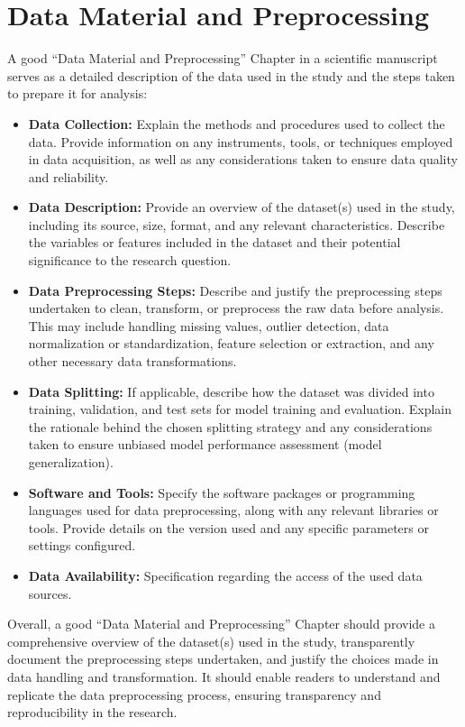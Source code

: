 \documentclass{article}
\begin{document}
\section{Data Material and Preprocessing}
A good ``Data Material and Preprocessing'' Chapter in a scientific manuscript serves as a detailed description of the data used in the study and the steps taken to prepare it for analysis:

\begin{itemize}
\item \textbf{Data Collection:} Explain the methods and procedures used to collect the data. Provide information on any instruments, tools, or techniques employed in data acquisition, as well as any considerations taken to ensure data quality and reliability.
\item \textbf{Data Description:} Provide an overview of the dataset(s) used in the study, including its source, size, format, and any relevant characteristics. Describe the variables or features included in the dataset and their potential significance to the research question.
\item \textbf{Data Preprocessing Steps:} Describe and justify the preprocessing steps undertaken to clean, transform, or preprocess the raw data before analysis. This may include handling missing values, outlier detection, data normalization or standardization, feature selection or extraction, and any other necessary data transformations.
\item \textbf{Data Splitting:} If applicable, describe how the dataset was divided into training, validation, and test sets for model training and evaluation. Explain the rationale behind the chosen splitting strategy and any considerations taken to ensure unbiased model performance assessment (model generalization).
\item \textbf{Software and Tools:} Specify the software packages or programming languages used for data preprocessing, along with any relevant libraries or tools. Provide details on the version used and any specific parameters or settings configured.
\item \textbf{Data Availability:} Specification regarding the access of the used data sources.
\end{itemize}

Overall, a good ``Data Material and Preprocessing'' Chapter should provide a comprehensive overview of the dataset(s) used in the study, transparently document the preprocessing steps undertaken, and justify the choices made in data handling and transformation. It should enable readers to understand and replicate the data preprocessing process, ensuring transparency and reproducibility in the research.
\end{document}
